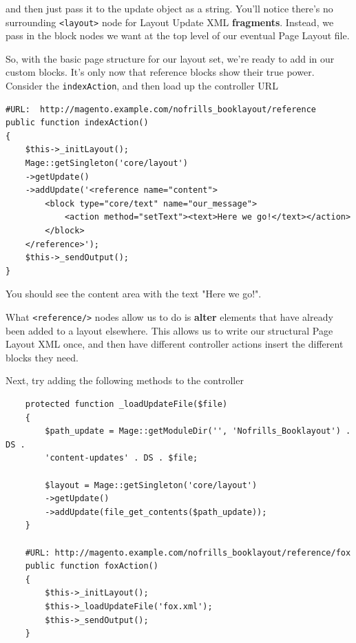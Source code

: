 \documentclass[oneside]{book}
\begin{document}
and then just pass it to the update object as a string.  You'll notice there's no surrounding \footnotesize\texttt{\textless layout\textgreater } \normalsize  node for Layout Update XML \textbf{fragments}.  Instead, we pass in the block nodes we want at the top level of our eventual Page Layout file.

So, with the basic page structure for our layout set, we're ready to add in our custom blocks.  It's only now that reference blocks show their true power.  Consider the \footnotesize\texttt{indexAction}\normalsize, and then load up the controller URL

\begin{lstlisting}
#URL:  http://magento.example.com/nofrills_booklayout/reference
public function indexAction()
{
    $this->_initLayout();
    Mage::getSingleton('core/layout')
    ->getUpdate()
    ->addUpdate('<reference name="content">
        <block type="core/text" name="our_message">
            <action method="setText"><text>Here we go!</text></action>
        </block>
    </reference>');
    $this->_sendOutput();
}

\end{lstlisting}


You should see the content area with the text "Here we go!".

What \footnotesize\texttt{\textless reference/\textgreater } \normalsize  nodes allow us to do is \textbf{alter} elements that have already been added to a layout elsewhere. This allows us to write our structural Page Layout XML once, and then have different controller actions insert the different blocks they need.

Next, try adding the following methods to the controller

\begin{lstlisting}
    protected function _loadUpdateFile($file)
    {
        $path_update = Mage::getModuleDir('', 'Nofrills_Booklayout') . DS .
        'content-updates' . DS . $file;

        $layout = Mage::getSingleton('core/layout')
        ->getUpdate()
        ->addUpdate(file_get_contents($path_update));
    }

    #URL: http://magento.example.com/nofrills_booklayout/reference/fox
    public function foxAction()
    {
        $this->_initLayout();
        $this->_loadUpdateFile('fox.xml');
        $this->_sendOutput();
    }

\end{lstlisting}
\end{document}
